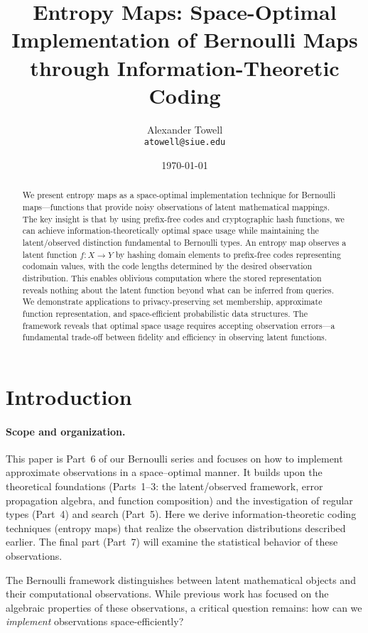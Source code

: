 \documentclass[11pt,final,hidelinks]{article}
\title{Entropy Maps: Space-Optimal Implementation of Bernoulli Maps through Information-Theoretic Coding}
\author{
    Alexander Towell\\
    \texttt{atowell@siue.edu}
}
\date{\today}
\begin{document}
\maketitle
\NotationSection

\begin{abstract}
We present entropy maps as a space-optimal implementation technique for Bernoulli maps—functions that provide noisy observations of latent mathematical mappings. The key insight is that by using prefix-free codes and cryptographic hash functions, we can achieve information-theoretically optimal space usage while maintaining the latent/observed distinction fundamental to Bernoulli types. An entropy map observes a latent function $f: X \to Y$ by hashing domain elements to prefix-free codes representing codomain values, with the code lengths determined by the desired observation distribution. This enables oblivious computation where the stored representation reveals nothing about the latent function beyond what can be inferred from queries. We demonstrate applications to privacy-preserving set membership, approximate function representation, and space-efficient probabilistic data structures. The framework reveals that optimal space usage requires accepting observation errors—a fundamental trade-off between fidelity and efficiency in observing latent functions.
\end{abstract}

\section{Introduction}

\paragraph{Scope and organization.}  This paper is Part~6 of our Bernoulli series and focuses on how to implement approximate observations in a space–optimal manner.  It builds upon the theoretical foundations (Parts~1--3: the latent/observed framework, error propagation algebra, and function composition) and the investigation of regular types (Part~4) and search (Part~5).  Here we derive information-theoretic coding techniques (entropy maps) that realize the observation distributions described earlier.  The final part (Part~7) will examine the statistical behavior of these observations.

The Bernoulli framework distinguishes between latent mathematical objects and their computational observations. While previous work has focused on the algebraic properties of these observations, a critical question remains: how can we \emph{implement} observations space-efficiently?
\end{document}
